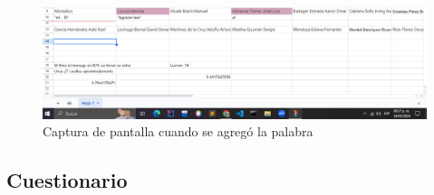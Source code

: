 \documentclass[10pt,letterpaper]{article}
\begin{document}
    \begin{figure}[H]
        \centering
        \includegraphics[scale=0.5]{P02/IMG/20240224-WA0002.png}
        \caption{Captura de pantalla cuando se agregó la palabra}
        \label{fig:}
    \end{figure}


\subsection*{Cuestionario}
    
\end{document}
